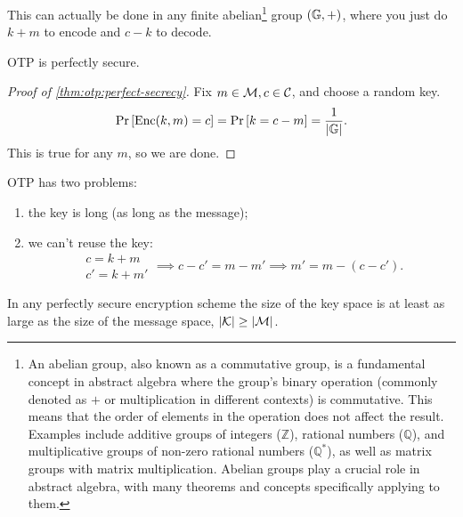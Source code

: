 This can actually be done in any finite abelian\footnote{An abelian group, also known as a commutative group, is a fundamental concept in abstract algebra where the group's binary operation (commonly denoted as \(+\) or multiplication in different contexts) is commutative. This means that the order of elements in the operation does not affect the result. Examples include additive groups of integers (\(\mathbb{Z}\)), rational numbers (\(\mathbb{Q}\)), and multiplicative groups of non-zero rational numbers (\(\mathbb{Q}^*\)), as well as matrix groups with matrix multiplication. Abelian groups play a crucial role in abstract algebra, with many theorems and concepts specifically applying to them.
} group $(\mathbb{G}, +)$, where you just do $k + m$ to encode and $c - k$ to decode.

\begin{theorem} \label{thm:otp:perfect-secrecy}
	\ac{OTP} is perfectly secure.
\end{theorem}

\begin{proof}[Proof of \cref{thm:otp:perfect-secrecy}]
	Fix $m \in \mathcal{M}, c \in \mathcal{C}$, and choose a random key.
	\begin{equation*}
		\mathop{\mathrm{Pr}}\limits_{} \left[ {\mathrm{Enc}(k,m) = c} \right] = \mathop{\mathrm{Pr}}\limits_{} \left[ {k = c - m} \right] = \frac{1}{\left|{\mathbb{G}}\right|}.
	\end{equation*}
	This is true for any $m$, so we are done.
\end{proof}

\ac{OTP} has two problems:
\begin{enumerate}
	\item the key is long (as long as the message);
	\item we can't reuse the key:
	\begin{equation*}
		\begin{array}{c}
			c = k + m \\
			c' = k + m'
		\end{array}
		\implies
		c - c' = m - m'
		\implies
		m' = m - (c - c').
	\end{equation*}
\end{enumerate}

\begin{theorem}[Shannon, 1949] \label{thm:shannon:1949}
	In any perfectly secure encryption scheme the size of the key space is at least as large as the size of the message space, \ie $\left|{\mathcal{K}}\right| \ge \left|{\mathcal{M}}\right|$.
\end{theorem}

